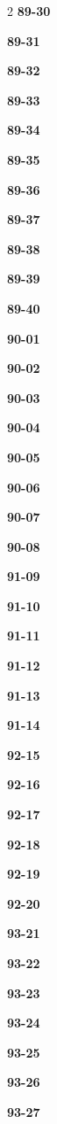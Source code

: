 \documentclass[10pt,a4paper]{article}
\begin{document}
\begin{multicols}{2}
\noindent\textbf{89-30}\ \par
\noindent\textbf{89-31}\ \par
\noindent\textbf{89-32}\ \par
\noindent\textbf{89-33}\ \par
\noindent\textbf{89-34}\ \par
\noindent\textbf{89-35}\ \par
\noindent\textbf{89-36}\ \par
\noindent\textbf{89-37}\ \par
\noindent\textbf{89-38}\ \par
\noindent\textbf{89-39}\ \par
\noindent\textbf{89-40}\ \par
\noindent\textbf{90-01}\ \par
\noindent\textbf{90-02}\ \par
\noindent\textbf{90-03}\ \par
\noindent\textbf{90-04}\ \par
\noindent\textbf{90-05}\ \par
\noindent\textbf{90-06}\ \par
\noindent\textbf{90-07}\ \par
\noindent\textbf{90-08}\ \par
\noindent\textbf{91-09}\ \par
\noindent\textbf{91-10}\ \par
\noindent\textbf{91-11}\ \par
\noindent\textbf{91-12}\ \par
\noindent\textbf{91-13}\ \par
\noindent\textbf{91-14}\ \par
\noindent\textbf{92-15}\ \par
\noindent\textbf{92-16}\ \par
\noindent\textbf{92-17}\ \par
\noindent\textbf{92-18}\ \par
\noindent\textbf{92-19}\ \par
\noindent\textbf{92-20}\ \par
\noindent\textbf{93-21}\ \par
\noindent\textbf{93-22}\ \par
\noindent\textbf{93-23}\ \par
\noindent\textbf{93-24}\ \par
\noindent\textbf{93-25}\ \par
\noindent\textbf{93-26}\ \par
\noindent\textbf{93-27}\ \par

\end{multicols}
\end{document}
